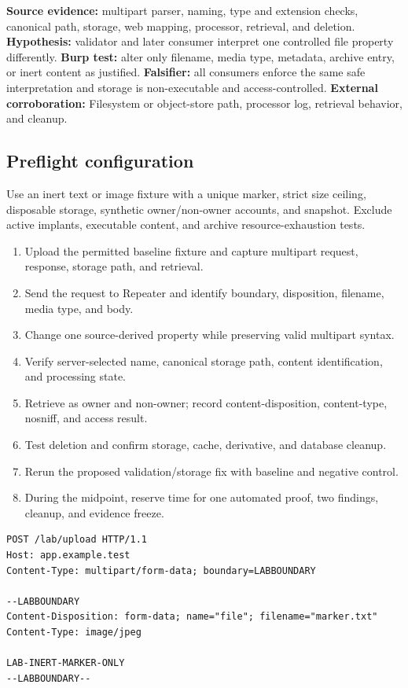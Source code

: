 \documentclass[11pt]{article}
\newcommand{\weekfield}[2]{%
  \Needspace{5\baselineskip}
  \subsection*{#1}
  #2
}
\newcommand{\externalproof}[1]{\textbf{External corroboration:} #1}
\begin{document}
\begin{bridgebox}
\textbf{Source evidence:} multipart parser, naming, type and extension checks,
canonical path, storage, web mapping, processor, retrieval, and deletion.
\textbf{Hypothesis:} validator and later consumer interpret one controlled file
property differently. \textbf{Burp test:} alter only filename, media type,
metadata, archive entry, or inert content as justified. \textbf{Falsifier:} all
consumers enforce the same safe interpretation and storage is non-executable and
access-controlled. \externalproof{Filesystem or object-store path, processor log,
retrieval behavior, and cleanup.}
\end{bridgebox}

\weekfield{Preflight configuration}{Use an inert text or image fixture with a
unique marker, strict size ceiling, disposable storage, synthetic owner/non-owner
accounts, and snapshot. Exclude active implants, executable content, and archive
resource-exhaustion tests.}

\begin{procedurebox}
\begin{enumerate}
  \item Upload the permitted baseline fixture and capture multipart request, response, storage path, and retrieval.
  \item Send the request to Repeater and identify boundary, disposition, filename, media type, and body.
  \item Change one source-derived property while preserving valid multipart syntax.
  \item Verify server-selected name, canonical storage path, content identification, and processing state.
  \item Retrieve as owner and non-owner; record content-disposition, content-type, nosniff, and access result.
  \item Test deletion and confirm storage, cache, derivative, and database cleanup.
  \item Rerun the proposed validation/storage fix with baseline and negative control.
  \item During the midpoint, reserve time for one automated proof, two findings, cleanup, and evidence freeze.
\end{enumerate}
\end{procedurebox}

\begin{lstlisting}[caption={Inert multipart mutation}]
POST /lab/upload HTTP/1.1
Host: app.example.test
Content-Type: multipart/form-data; boundary=LABBOUNDARY

--LABBOUNDARY
Content-Disposition: form-data; name="file"; filename="marker.txt"
Content-Type: image/jpeg

LAB-INERT-MARKER-ONLY
--LABBOUNDARY--
\end{lstlisting}
\end{document}
